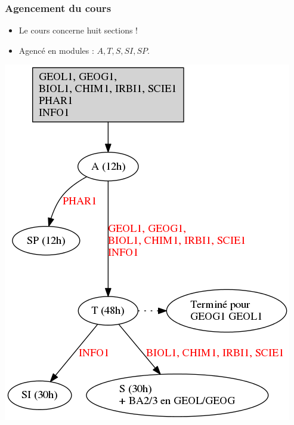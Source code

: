 \begin{frame}%
  \frametitle{Agencement du cours}
  \begin{minipage}{0.4\textwidth}
    \begin{itemize}
    \item Le cours concerne huit sections !

    \item Agencé en modules : \(A, T, S, SI, SP\).
    \end{itemize}
  \end{minipage}
  \begin{minipage}{0.4\textwidth}
    \includegraphics[width=\textwidth]{112-organisation-avec-anet-alt}
  \end{minipage}
\end{frame}
